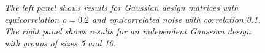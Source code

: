 \documentclass{imsart}
\begin{document}
\begin{figure}[h]
\begin{center}
\hspace{-15pt}
\caption{\small \it The left panel shows results for Gaussian design
matrices with equicorrelation $\rho=0.2$ and equicorrelated noise with
correlation 0.1. The right panel shows results for an independent
Gaussian design with groups of sizes 5 and 10.}
\end{center}
\end{figure}





\end{document}

